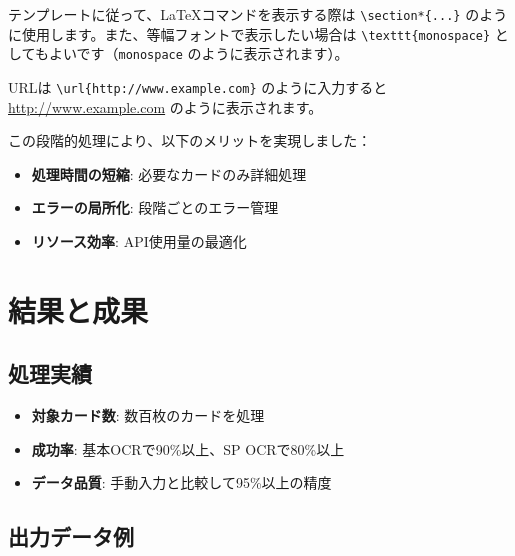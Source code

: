 \documentclass[a4paper,11pt]{jsarticle}
\begin{document}
テンプレートに従って、LaTeXコマンドを表示する際は \verb=\section*{...}= のように使用します。また、等幅フォントで表示したい場合は \verb|\texttt{monospace}| としてもよいです（\texttt{monospace} のように表示されます）。

URLは \verb=\url{http://www.example.com}= のように入力すると \url{http://www.example.com} のように表示されます。

この段階的処理により、以下のメリットを実現しました：
\begin{itemize}
    \item \textbf{処理時間の短縮}: 必要なカードのみ詳細処理
    \item \textbf{エラーの局所化}: 段階ごとのエラー管理
    \item \textbf{リソース効率}: API使用量の最適化
\end{itemize}

\section*{結果と成果}

\subsection*{処理実績}
\begin{itemize}
    \item \textbf{対象カード数}: 数百枚のカードを処理
    \item \textbf{成功率}: 基本OCRで90\%以上、SP OCRで80\%以上
    \item \textbf{データ品質}: 手動入力と比較して95\%以上の精度
\end{itemize}

\subsection*{出力データ例}
\end{document}
